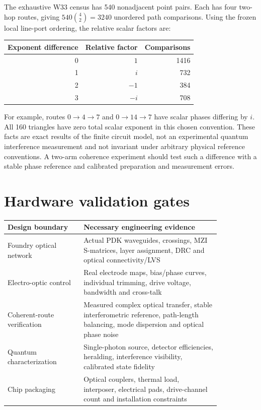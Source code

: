 \documentclass[10pt]{article}
\begin{document}
The exhaustive W33 census has 540 nonadjacent point pairs.
Each has four two-hop routes, giving $540\binom42=3240$
unordered path comparisons. Using the frozen local
line-port ordering, the relative scalar factors are:
\begin{center}
\begin{tabular}{rrr}
\toprule
Exponent difference & Relative factor & Comparisons\\\midrule
0 & $1$ & 1416\\
1 & $i$ & 732\\
2 & $-1$ & 384\\
3 & $-i$ & 708\\\bottomrule
\end{tabular}
\end{center}
For example, routes $0\to4\to7$ and $0\to14\to7$
have scalar phases differing by $i$. All 160 triangles
have zero total scalar exponent in this chosen convention.
These facts are exact results of the finite circuit model,
not an experimental quantum interference measurement and
not invariant under arbitrary physical reference conventions.
A two-arm coherence experiment should test such a difference
with a stable phase reference and calibrated preparation
and measurement errors.

\section{Hardware validation gates}
\begin{longtable}{p{0.30\linewidth}p{0.54\linewidth}}
\toprule
Design boundary & Necessary engineering evidence\\\midrule
Foundry optical network & Actual PDK waveguides, crossings, MZI S-matrices,
layer assignment, DRC and optical connectivity/LVS\\
Electro-optic control & Real electrode maps, bias/phase curves,
individual trimming, drive voltage, bandwidth and cross-talk\\
Coherent-route verification & Measured complex optical transfer,
stable interferometric reference, path-length balancing,
mode dispersion and optical phase noise\\
Quantum characterization & Single-photon source, detector efficiencies,
heralding, interference visibility, calibrated state fidelity\\
Chip packaging & Optical couplers, thermal load, interposer,
electrical pads, drive-channel count and installation constraints\\
\bottomrule
\end{longtable}
\end{document}
